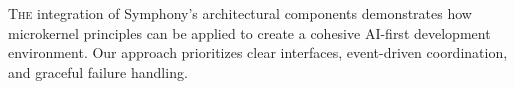 
\lettrine{T}{he} integration of Symphony's architectural components demonstrates how microkernel principles can be applied to create a cohesive AI-first development environment. Our approach prioritizes clear interfaces, event-driven coordination, and graceful failure handling.

% 
% 
% 
% 
% 
